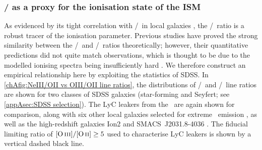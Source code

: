 \subsubsection{\texorpdfstring{\NeIII/\OII}{[Ne III]/[O II]} as a proxy for the ionisation state of the ISM}
\label{chAsssec:NeIII/OII as a proxy for the ionisation state of the ISM}

As evidenced by its tight correlation with \OIIIf/\OII\ in local galaxies \citep[e.g.][]{2020ApJ...902L..16J}, the \NeIII/\OII\ ratio is a robust tracer of the ionisation parameter. Previous studies have proved the strong similarity between the \NeIII/\OII\ and \OIIIf/\OII\ ratios theoretically; however, their quantitative predictions did not quite match observations, which is thought to be due to the modelled ionising spectra being insufficiently hard \citep{2014ApJ...780..100L}. We therefore construct an empirical relationship here by exploiting the statistics of SDSS. In \cref{chAfig:NeIII/OII vs OIII/OII line ratios}, the distributions of \NeIII/\OII\ and \OIIIf/\OII\ line ratios are shown for two classes of SDSS galaxies (star-forming and Seyfert; see \cref{appAsec:SDSS selection}). The LyC leakers from the \Isample\ are again shown for comparison, along with six other local galaxies selected for extreme \OIIIf\ emission \citep[``Green Peas'', or GPs;][]{2013ApJ...766...91J}, as well as the high-redshift galaxies Ion2 and SMACS~J2031.8-4036 \citep[, respectively]{2020MNRAS.491.1093V, 2012MNRAS.427.1953C}. The fiducial limiting ratio of $\OIIIf/\OII \geq 5$ used to characterise LyC leakers is shown by a vertical dashed black line.

